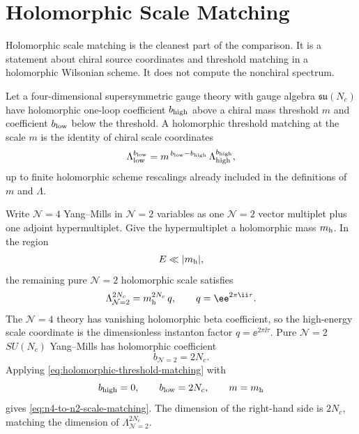 \section{Holomorphic Scale Matching}
\label{sec:susy-ym-family-scale-matching}

Holomorphic scale matching is the cleanest part of the comparison.  It is a
statement about chiral source coordinates and threshold matching in a
holomorphic Wilsonian scheme.  It does not compute the nonchiral spectrum.

\begin{definition}
\label{def:holomorphic-threshold-matching}
Let a four-dimensional supersymmetric gauge theory with gauge algebra
\(\mathfrak{su}(N_c)\) have holomorphic one-loop coefficient \(b_{\rm high}\)
above a chiral mass threshold \(m\) and coefficient \(b_{\rm low}\) below the
threshold.  A holomorphic threshold matching at the scale \(m\) is the
identity of chiral scale coordinates
\begin{equation}
  \Lambda_{\rm low}^{b_{\rm low}}
  =
  m^{\,b_{\rm low}-b_{\rm high}}\,
  \Lambda_{\rm high}^{b_{\rm high}},
  \label{eq:holomorphic-threshold-matching}
\end{equation}
up to finite holomorphic scheme rescalings already included in the
definitions of \(m\) and \(\Lambda\).
\end{definition}

Write \(\mathcal N=4\) Yang--Mills in \(\mathcal N=2\) variables as one
\(\mathcal N=2\) vector multiplet plus one adjoint hypermultiplet.  Give the
hypermultiplet a holomorphic mass \(m_{\rm h}\).  In the region
\[
  E\ll |m_{\rm h}|,
\]
the remaining pure \(\mathcal N=2\) holomorphic scale satisfies
\begin{equation}
  \Lambda_{\mathcal N=2}^{2N_c}
  =
  m_{\rm h}^{2N_c}\,q,
  \qquad
  q=\ee^{2\pi\ii\tau}.
  \label{eq:n4-to-n2-scale-matching}
\end{equation}
The \(\mathcal N=4\) theory has vanishing holomorphic beta coefficient, so
the high-energy scale coordinate is the dimensionless instanton factor
\(q=\ee^{2\pi\ii\tau}\).  Pure \(\mathcal N=2\) \(SU(N_c)\) Yang--Mills has
holomorphic coefficient
\[
  b_{\mathcal N=2}=2N_c .
\]
Applying \eqref{eq:holomorphic-threshold-matching} with
\[
  b_{\rm high}=0,\qquad b_{\rm low}=2N_c,\qquad m=m_{\rm h}
\]
gives \eqref{eq:n4-to-n2-scale-matching}.  The dimension of the right-hand
side is \(2N_c\), matching the dimension of
\(\Lambda_{\mathcal N=2}^{2N_c}\).

